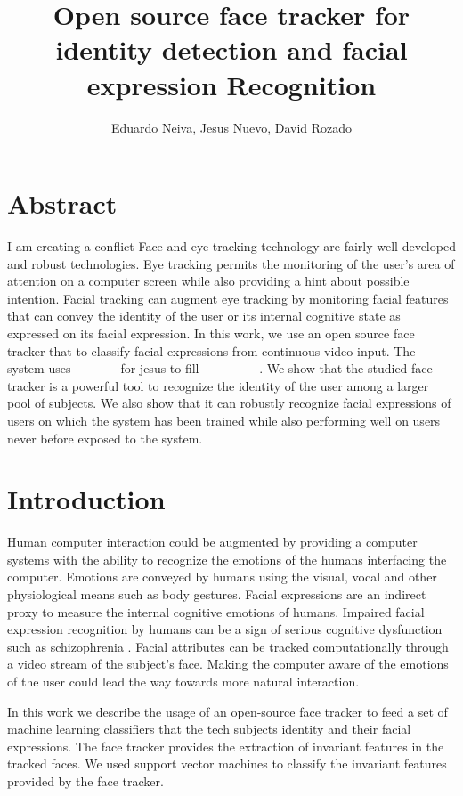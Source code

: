 \documentclass[]{article}
\title{Open source face tracker for identity detection and facial expression Recognition}
\author{Eduardo Neiva, Jesus Nuevo, David Rozado}
\begin{document}
\maketitle

\section{Abstract}
I am creating a conflict
Face and eye tracking technology are fairly well developed and robust technologies. Eye tracking permits the monitoring 
of the user's area of attention on a computer screen while also providing a hint about possible intention.
Facial tracking can augment eye tracking by monitoring facial features that can convey the identity of the user or its
internal cognitive state as expressed on its facial expression. In this work, we use an open source face tracker that to
classify facial expressions from continuous video input. The system uses ---------- for jesus to fill --------------. We
show that the studied face tracker is a powerful tool to recognize the identity of the user among a larger pool of
subjects. We also show  that it can robustly recognize facial expressions of users on which the system has been trained
while also performing well on users never before exposed to the system.


\section{Introduction}
Human computer interaction could be augmented by providing a computer systems with the ability to recognize the emotions
of the humans interfacing the computer. Emotions are conveyed by humans  using the visual, vocal and other physiological
means such as body gestures. Facial expressions are an indirect proxy to measure the internal cognitive emotions of
humans. Impaired facial expression recognition by humans can be a sign of serious cognitive dysfunction such as
schizophrenia \cite{Edwards2002789}.  Facial attributes can be tracked computationally through a video stream of the
subject's face. Making the computer aware of the emotions of the user could lead the way towards more natural interaction.


In this work we describe the usage of an open-source face tracker to feed a set of machine learning classifiers that the
tech subjects identity and their facial expressions. The face tracker provides the extraction of invariant features in
the tracked faces. We used support vector machines  to classify the invariant features provided by the face tracker.
\end{document}
